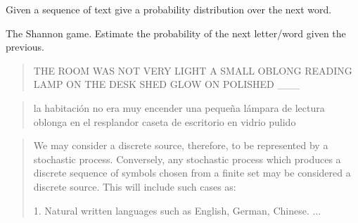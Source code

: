\documentclass{beamer}
\newcommand{\air}{\vspace{0.25cm}}
\begin{document}
\begin{frame}
  \begin{center}
  \end{center}
  Given a sequence of text give a probability distribution 
  over the next word. 

\air

  The Shannon game. Estimate the probability of the next letter/word
  given the previous.

  \begin{quote}
    THE ROOM WAS NOT VERY LIGHT A SMALL OBLONG READING LAMP ON THE
    DESK SHED GLOW ON POLISHED \_\_\_\
  \end{quote}
  \pause

  \begin{quote}
    la habitación no era muy encender una pequeña lámpara de lectura oblonga en el resplandor caseta de escritorio en vidrio pulido
  \end{quote}

\end{frame}
\begin{frame}
  \begin{center}
  \end{center}
\air
  
\begin{quote}  
  We may consider a discrete source, therefore,
to be represented by a stochastic process. Conversely, any stochastic
process which produces a discrete sequence of symbols chosen from a finite
set may be considered a discrete source. This will include such cases as:

1. Natural written languages such as English, German, Chinese.
...
\end{quote}
\end{frame}
\end{document}
